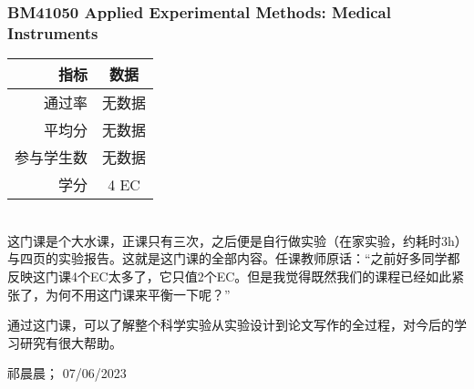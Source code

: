 \subsubsection{BM41050 Applied Experimental Methods: Medical Instruments}
\begin{minipage}{0.45\textwidth}
\centering
{}
\end{minipage}%
\begin{minipage}{0.45\textwidth}
\raggedleft
\begin{tabular}{r|c}
\textbf{指标} & \textbf{数据} \\ \hline
通过率 & 无数据 \\ 
平均分 & 无数据 \\ 
参与学生数 & 无数据 \\
学分 & 4 EC\\
\end{tabular}
\end{minipage}\\

这门课是个大水课，正课只有三次，之后便是自行做实验（在家实验，约耗时3h）与四页的实验报告。这就是这门课的全部内容。任课教师原话：“之前好多同学都反映这门课4个EC太多了，它只值2个EC。但是我觉得既然我们的课程已经如此紧张了，为何不用这门课来平衡一下呢？”

通过这门课，可以了解整个科学实验从实验设计到论文写作的全过程，对今后的学习研究有很大帮助。
\begin{flushright}
祁晨晨； 07/06/2023
\end{flushright}

